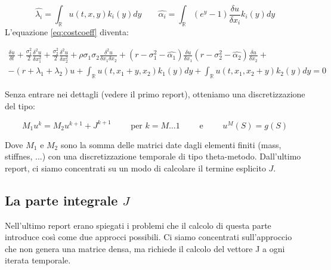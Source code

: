 \documentclass[a4paper,10pt]{article}
\newcommand{\der}[2]{\frac{\delta #1}{\delta #2}}
\newcommand{\dder}[2]{\frac{\delta^2 #1}{\delta #2^2}}
\newcommand{\dmix}[3]{\frac{\delta^2 #1}{\delta #2 \delta #3}}
\begin{document}
\begin{equation*}
 \hat{\lambda_i}=\int_\mathbb{R}u(t,x,y)k_i(y)dy \qquad \hat{\alpha_i}=\int_\mathbb{R}(e^y-1)\der{u}{x_i}k_i(y)dy
\end{equation*}
L'equazione \eqref{eq:costcoeff} diventa: 

{
\small
\begin{multline}
 \der{u}{t}+\frac{\sigma_1^2}{2}\dder{u}{x_1}+\frac{\sigma_2^2}{2}\dder{u}{x_2}+\rho\sigma_1\sigma_2\dmix{u}{x_1}{x_2}+
 \left(r-\sigma_1^2-\hat{\alpha_1}\right)\der{u}{x_1}
 \left(r-\sigma_2^2-\hat{\alpha_2}\right)\der{u}{x_2}+\\-(r+\lambda_1+\lambda_2)u+
 \int_\mathbb{R}u(t,x_1+y,x_2)k_1(y)dy+
 \int_\mathbb{R}u(t,x_1,x_2+y)k_2(y)dy=0
 \label{eq:costcoeff2}
\end{multline}
}


Senza entrare nei dettagli (vedere il primo report), otteniamo una discretizzazione del tipo:

\begin{equation}
 M_1u^k=M_2u^{k+1}+J^{k+1}  \qquad \text{ per } k=M\dots1 \qquad \text{ e } \qquad u^{M}(S)=g(S) 
\end{equation}

Dove $M_1$ e $M_2$ sono la somma delle matrici date dagli elementi finiti (mass, stiffnes, ...) con una discretizzazione temporale di tipo theta-metodo. Dall'ultimo report, ci siamo concentrati su un modo di calcolare il termine esplicito $J$.

\subsection{La parte integrale $J$}

Nell'ultimo report erano spiegati i problemi che il calcolo di questa parte introduce così come due approcci possibili. Ci siamo concentrati sull'approccio che non genera una matrice densa, ma richiede il calcolo del vettore J a ogni iterata temporale.
\end{document}
